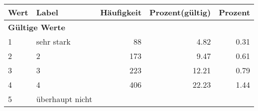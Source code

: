      \begin{longtable}{lXrrr}
     \toprule
     \textbf{Wert} & \textbf{Label} & \textbf{Häufigkeit} & \textbf{Prozent(gültig)} & \textbf{Prozent} \\
     \endhead
     \midrule
     \multicolumn{5}{l}{\textbf{Gültige Werte}}\\

     1 &
     \multicolumn{1}{X}{ sehr stark   } &


       \num{88} &
       \num[round-mode=places,round-precision=2]{4.82} &
         \num[round-mode=places,round-precision=2]{0.31} \\

     2 &
     \multicolumn{1}{X}{ 2   } &


       \num{173} &
       \num[round-mode=places,round-precision=2]{9.47} &
         \num[round-mode=places,round-precision=2]{0.61} \\

     3 &
     \multicolumn{1}{X}{ 3   } &


       \num{223} &
       \num[round-mode=places,round-precision=2]{12.21} &
         \num[round-mode=places,round-precision=2]{0.79} \\

     4 &
     \multicolumn{1}{X}{ 4   } &


       \num{406} &
       \num[round-mode=places,round-precision=2]{22.23} &
         \num[round-mode=places,round-precision=2]{1.44} \\

     5 &
     \multicolumn{1}{X}{ überhaupt nicht   } &



\end{longtable}
